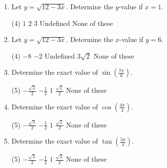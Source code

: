 \documentclass{article}
\begin{document}


\begin{enumerate}
\item Let \(y = \sqrt{12-3x}\). Determine the \(y\)-value if \(x=1\).
   \begin{tasks}[label=(\alph*),label-width=2em](4)
    \task \(1\) 
    \task \(2\)
    \task \(3\) %
    \task Undefined
    \task None of these
  \end{tasks} 

\item Let \(y = \sqrt{12-3x}\). Determine the \(x\)-value if \(y=6\).
   \begin{tasks}[label=(\alph*),label-width=2em](4)
    \task \(-8\)  %
    \task \(-2\) 
    \task Undefined
    \task \(3\sqrt{2}\)
    \task None of these 
  \end{tasks} 
  \vspace{1in}
  
\item Determine the exact value of \( \sin\left(\frac{7\pi}{6}\right) \).
   \begin{tasks}[label=(\alph*),label-width=2em](5)
    \task \(-\displaystyle\frac{\sqrt{3}}{2}\)
    \task \(-\displaystyle\frac{1}{2}\) %
    \task \(1\)
    \task \(\displaystyle\frac{\sqrt{2}}{2}\)
    \task None of these
  \end{tasks} 

\item Determine the exact value of \( \cos\left(\frac{4\pi}{3}\right) \).
   \begin{tasks}[label=(\alph*),label-width=2em](5)
    \task \(-\displaystyle\frac{\sqrt{3}}{2}\)
    \task \(-\displaystyle\frac{1}{2}\) %
    \task \(1\)
    \task \(\displaystyle\frac{\sqrt{2}}{2}\)
    \task None of these  
  \end{tasks} 

\item Determine the exact value of \( \tan\left(\frac{5\pi}{4}\right) \).
   \begin{tasks}[label=(\alph*),label-width=2em](5)
    \task \(-\displaystyle\frac{\sqrt{3}}{2}\)
    \task \(-\displaystyle\frac{1}{2}\) 
    \task \(1\) %
    \task \(\displaystyle\frac{\sqrt{2}}{2}\)
    \task None of these  
  \end{tasks} \vfill


\end{enumerate}
\end{document}
